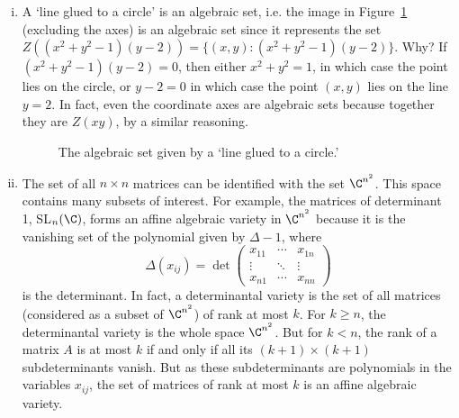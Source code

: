 \begin{ex}
\begin{enumerate}[(i)]
\item A `line glued to a circle' is an algebraic set, i.e. the image in Figure~\ref{fig:linegluecirc} (excluding the axes) is an algebraic set since it represents the set $Z((x^2+y^2-1)(y-2))=\{ (x,y) \colon (x^2+y^2-1)(y-2) \}$. Why? If $(x^2+y^2-1)(y-2)=0$, then either $x^2+y^2=1$, in which case the point lies on the circle, or $y-2=0$ in which case the point $(x,y)$ lies on the line $y=2$. In fact, even the coordinate axes are algebraic sets because together they are $Z(xy)$, by a similar reasoning. 
	\begin{figure}[h!]
	\centering
	\caption{The algebraic set given by a `line glued to a circle.' \label{fig:linegluecirc}}
	\end{figure}


\item The set of all $n \times n$ matrices can be identified with the set $\C^{n^2}$. This space contains many subsets of interest. For example, the matrices of determinant 1, SL$_n(\C)$, forms an affine algebraic variety in $\C^{n^2}$ because it is the vanishing set of the polynomial given by $\Delta - 1$, where
	\[
	\Delta(x_{ij})= \det 
	\begin{pmatrix} 
	x_{11} &  \cdots & x_{1n} \\ 
	\vdots & \ddots & \vdots \\
	x_{n1} & \cdots & x_{nn}
	\end{pmatrix}
	\]
is the determinant. In fact, a determinantal variety is the set of all matrices (considered as a subset of $\C^{n^2}$) of rank at most $k$. For $k \geq n$, the determinantal variety is the whole space $\C^{n^2}$. But for $k<n$, the rank of a matrix $A$ is at most $k$ if and only if all its $(k+1) \times (k+1)$ subdeterminants vanish. But as these subdeterminants are polynomials in the variables $x_{ij}$, the set of matrices of rank at most $k$ is an affine algebraic variety.  \xqed
\end{enumerate}
\end{ex}


